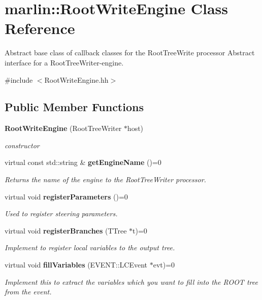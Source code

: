 \section{marlin\-:\-:Root\-Write\-Engine Class Reference}
\label{classmarlin_1_1RootWriteEngine}


Abstract base class of callback classes for the Root\-Tree\-Write processor Abstract interface for a Root\-Tree\-Writer-\/engine.  




{\ttfamily \#include $<$Root\-Write\-Engine.\-hh$>$}

\subsection*{Public Member Functions}
\begin{DoxyCompactItemize}
\item 
{\bf Root\-Write\-Engine} (Root\-Tree\-Writer $\ast$host)
\begin{DoxyCompactList}\small\item\em constructor \end{DoxyCompactList}\item 
virtual const std\-::string \& {\bf get\-Engine\-Name} ()=0
\begin{DoxyCompactList}\small\item\em Returns the name of the engine to the Root\-Tree\-Writer processor. \end{DoxyCompactList}\item 
virtual void {\bf register\-Parameters} ()=0
\begin{DoxyCompactList}\small\item\em Used to register steering parameters. \end{DoxyCompactList}\item 
virtual void {\bf register\-Branches} (T\-Tree $\ast$t)=0
\begin{DoxyCompactList}\small\item\em Implement to register local variables to the output tree. \end{DoxyCompactList}\item 
virtual void {\bf fill\-Variables} (E\-V\-E\-N\-T\-::\-L\-C\-Event $\ast$evt)=0
\begin{DoxyCompactList}\small\item\em Implement this to extract the variables which you want to fill into the {\itshape R\-O\-O\-T} tree from the event. \end{DoxyCompactList}\end{DoxyCompactItemize}
